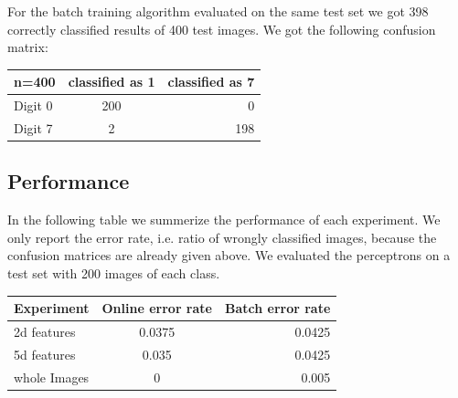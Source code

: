 For the batch training algorithm evaluated on the same test set we got 398 correctly classified results of 400 test images. We got the following confusion matrix:

\begin{tabular}{ l | c | r }
\centering
  n=400 & classified as 1 & classified as 7 \\ \hline
  Digit 0 & 200 & 0 \\
  Digit 7 & 2 & 198 \\
\end{tabular}

\subsection{Performance}
In the following table we summerize the performance of each experiment. We only report the error rate, i.e. ratio of wrongly classified images, because the confusion matrices are already given above. We evaluated the perceptrons on a test set with 200 images of each class.


\begin{tabular}{ l | c | r }
\centering
  Experiment & Online error rate & Batch error rate \\ \hline
  2d features & 0.0375 & 0.0425 \\
  5d features & 0.035 & 0.0425 \\
  whole Images  & 0 & 0.005 \\
\end{tabular}


